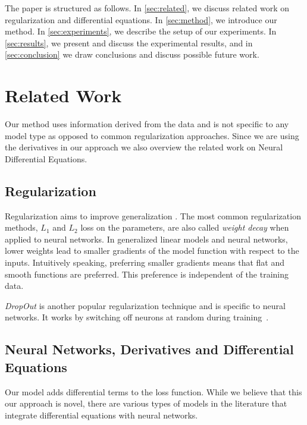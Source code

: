 \documentclass[conference]{IEEEtran}
\begin{document}
The paper is structured as follows.
In \autoref{sec:related}, we discuss related work on regularization and differential equations. 
In \autoref{sec:method}, we introduce our method. 
In \autoref{sec:experiments}, we describe the setup of our experiments. 
In \autoref{sec:results}, we present and discuss the experimental results, and in \autoref{sec:conclusion} we draw conclusions and discuss possible future work.


\section{Related Work}\label{sec:related}

Our method uses information derived from the data and is not specific to any model type as opposed to common regularization approaches.
Since we are using the derivatives in our approach we also overview the related work on Neural Differential Equations.

\subsection{Regularization}
Regularization aims to improve generalization \cite{Kukacka2017regsurvey}.
The most common regularization methods, $L_1$ and $L_2$ loss on the parameters, are also called \emph{weight decay} when applied to neural networks.
In generalized linear models and neural networks, lower weights lead to smaller gradients of the model function with respect to the inputs. 
Intuitively speaking, preferring smaller gradients means that flat and smooth functions are preferred. 
This preference is independent of the training data.

\emph{DropOut} is another popular regularization technique and is specific to neural networks. 
It works by switching off neurons at random during training~\cite{srivastava2014dropout,baldi2013understanding}. 

\subsection{Neural Networks, Derivatives and Differential Equations} 

Our model adds differential terms to the loss function. 
While we believe that this our approach is novel, there are various types of models in the literature that integrate differential equations with neural networks. 
\end{document}
